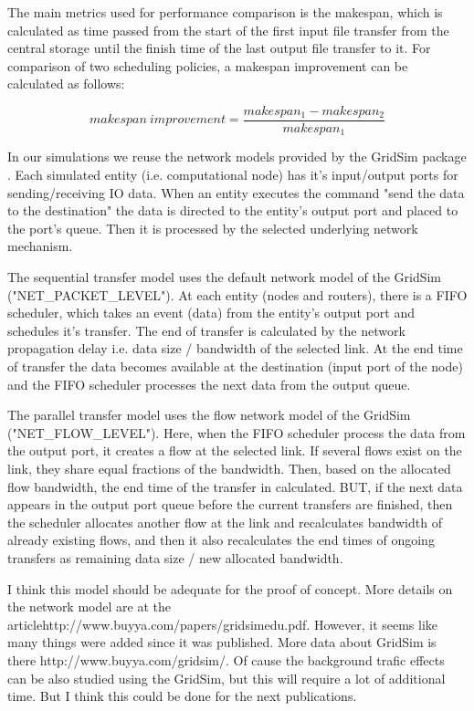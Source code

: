 \documentclass{svjour3}                     %
\begin{document}
The main metrics used for performance comparison is the makespan, which is calculated as time passed from the start of the first input file transfer from the central storage until the finish time of the last output file transfer to it. For comparison of two scheduling policies, a makespan improvement can be calculated as follows:


\begin{equation}
\label{makespanImprovement}
 makespan~improvement = \frac{makespan_{1} - makespan_{2}}{makespan_{1}} 
\end{equation}

In our simulations we reuse the network models provided by the GridSim package \cite{GridSimNetwork}. Each simulated entity (i.e. computational node) has it's input/output ports for sending/receiving IO data. When an entity executes the command "send the data to the destination" the data is directed to the entity's output port and placed to the port's queue. Then it is processed by the selected underlying network mechanism. 

The sequential transfer model uses the default network model of the GridSim ("NET\_PACKET\_LEVEL"). At each entity (nodes and routers), there is a FIFO scheduler, which takes an event (data) from the entity's output port and schedules it's transfer. The end of transfer is calculated by the network propagation delay i.e. data size / bandwidth of the selected link. At the end time of transfer the data becomes available at the destination (input port of the node) and the FIFO scheduler processes the next data from the output queue.

The parallel transfer model uses the flow network model of the GridSim ("NET\_FLOW\_LEVEL"). Here, when the FIFO scheduler process the data from the output port, it creates a flow at the selected link. If several flows exist on the link, they share equal fractions of the bandwidth. Then, based on the allocated flow bandwidth, the end time of the transfer in calculated. BUT, if the next data appears  in the output port queue before the current transfers are finished, then the scheduler allocates another flow at the link and recalculates bandwidth of already existing flows, and then it also recalculates the end times of ongoing transfers as remaining data size / new allocated bandwidth.

I think this model should be adequate for the proof of concept. More details on the network model are at the articlehttp://www.buyya.com/papers/gridsimedu.pdf. However, it seems like many things were added since it was published.  More data about GridSim is there http://www.buyya.com/gridsim/. Of cause the background trafic effects can be also studied using the GridSim, but this will require a lot of additional time. But I think this could be done for the next publications. 
\end{document}
